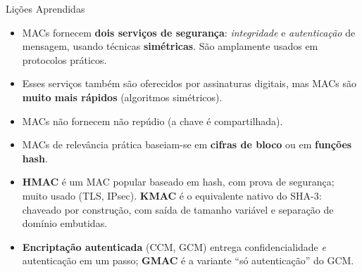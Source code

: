 \documentclass{beamer}
\begin{document}
\begin{frame}{Lições Aprendidas}
    \begin{itemize}
        \item MACs fornecem \textbf{dois serviços de segurança}: \emph{integridade} e \emph{autenticação} de mensagem, usando técnicas \textbf{simétricas}. São amplamente usados em protocolos práticos.
        \medskip
        \item Esses serviços também são oferecidos por assinaturas digitais, mas MACs são \textbf{muito mais rápidos} (algoritmos simétricos).
        \medskip
        \item MACs \alert{não fornecem não repúdio} (a chave é compartilhada).
        \medskip
        \item MACs de relevância prática baseiam-se em \textbf{cifras de bloco} ou em \textbf{funções hash}.
        \medskip
        \item \textbf{HMAC} é um MAC popular baseado em hash, com prova de segurança; muito usado (TLS, IPsec). \textbf{KMAC} é o equivalente nativo do SHA-3: chaveado por construção, com saída de tamanho variável e separação de domínio embutidas.
        \medskip
        \item \textbf{Encriptação autenticada} (CCM, GCM) entrega confidencialidade \emph{e} autenticação em um passo; \textbf{GMAC} é a variante ``só autenticação'' do GCM.
    \end{itemize}
\end{frame}
\end{document}
